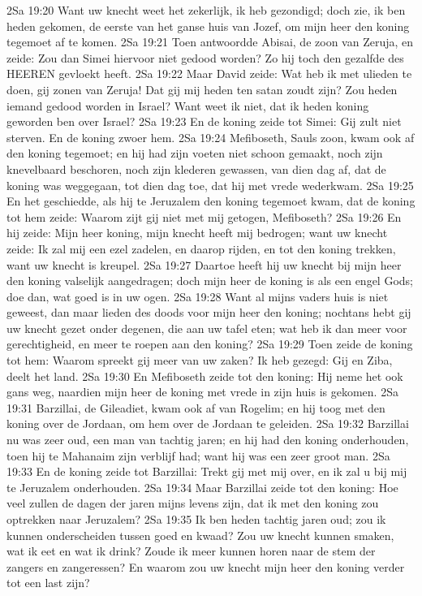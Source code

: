2Sa 19:20  Want uw knecht weet het zekerlijk, ik heb gezondigd; doch zie, ik ben heden gekomen, de eerste van het ganse huis van Jozef, om mijn heer den koning tegemoet af te komen.
2Sa 19:21  Toen antwoordde Abisai, de zoon van Zeruja, en zeide: Zou dan Simei hiervoor niet gedood worden? Zo hij toch den gezalfde des HEEREN gevloekt heeft.
2Sa 19:22  Maar David zeide: Wat heb ik met ulieden te doen, gij zonen van Zeruja! Dat gij mij heden ten satan zoudt zijn? Zou heden iemand gedood worden in Israel? Want weet ik niet, dat ik heden koning geworden ben over Israel?
2Sa 19:23  En de koning zeide tot Simei: Gij zult niet sterven. En de koning zwoer hem.
2Sa 19:24  Mefiboseth, Sauls zoon, kwam ook af den koning tegemoet; en hij had zijn voeten niet schoon gemaakt, noch zijn knevelbaard beschoren, noch zijn klederen gewassen, van dien dag af, dat de koning was weggegaan, tot dien dag toe, dat hij met vrede wederkwam.
2Sa 19:25  En het geschiedde, als hij te Jeruzalem den koning tegemoet kwam, dat de koning tot hem zeide: Waarom zijt gij niet met mij getogen, Mefiboseth?
2Sa 19:26  En hij zeide: Mijn heer koning, mijn knecht heeft mij bedrogen; want uw knecht zeide: Ik zal mij een ezel zadelen, en daarop rijden, en tot den koning trekken, want uw knecht is kreupel.
2Sa 19:27  Daartoe heeft hij uw knecht bij mijn heer den koning valselijk aangedragen; doch mijn heer de koning is als een engel Gods; doe dan, wat goed is in uw ogen.
2Sa 19:28  Want al mijns vaders huis is niet geweest, dan maar lieden des doods voor mijn heer den koning; nochtans hebt gij uw knecht gezet onder degenen, die aan uw tafel eten; wat heb ik dan meer voor gerechtigheid, en meer te roepen aan den koning?
2Sa 19:29  Toen zeide de koning tot hem: Waarom spreekt gij meer van uw zaken? Ik heb gezegd: Gij en Ziba, deelt het land.
2Sa 19:30  En Mefiboseth zeide tot den koning: Hij neme het ook gans weg, naardien mijn heer de koning met vrede in zijn huis is gekomen.
2Sa 19:31  Barzillai, de Gileadiet, kwam ook af van Rogelim; en hij toog met den koning over de Jordaan, om hem over de Jordaan te geleiden.
2Sa 19:32  Barzillai nu was zeer oud, een man van tachtig jaren; en hij had den koning onderhouden, toen hij te Mahanaim zijn verblijf had; want hij was een zeer groot man.
2Sa 19:33  En de koning zeide tot Barzillai: Trekt gij met mij over, en ik zal u bij mij te Jeruzalem onderhouden.
2Sa 19:34  Maar Barzillai zeide tot den koning: Hoe veel zullen de dagen der jaren mijns levens zijn, dat ik met den koning zou optrekken naar Jeruzalem?
2Sa 19:35  Ik ben heden tachtig jaren oud; zou ik kunnen onderscheiden tussen goed en kwaad? Zou uw knecht kunnen smaken, wat ik eet en wat ik drink? Zoude ik meer kunnen horen naar de stem der zangers en zangeressen? En waarom zou uw knecht mijn heer den koning verder tot een last zijn?
